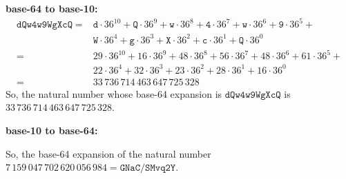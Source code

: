 \begin{mysolution}
    \textbf{base-64 to base-10:}
    \begin{align*}
        \mathtt{dQw4w9WgXcQ} =& \mathtt{d}\cdot 36^{10}+\mathtt{Q}\cdot 36^{9}+\mathtt{w}\cdot 36^{8}+\mathtt{4}\cdot 36^{7}+\mathtt{w}\cdot 36^{6}+\mathtt{9}\cdot 36^{5}+\\
        &\mathtt{W}\cdot 36^{4}+\mathtt{g}\cdot 36^{3}+\mathtt{X}\cdot 36^{2}+\mathtt{c}\cdot 36^{1}+\mathtt{Q}\cdot 36^{0}\\
        = & 29 \cdot 36^{10}+16 \cdot 36^{9}+48 \cdot 36^{8}+56 \cdot 36^{7}+48 \cdot 36^{6}+61 \cdot 36^{5}+\\
        &22 \cdot 36^{4}+32 \cdot 36^{3}+23 \cdot 36^{2}+28 \cdot 36^{1}+16 \cdot 36^{0}\\
        = & 33\,736\,714\,463\,647\,725\,328
    \end{align*}
    So, the natural number whose base-64 expansion is $\mathtt{dQw4w9WgXcQ}$ is $33\,736\,714\,463\,647\,725\,328$.
    
    \textbf{base-10 to base-64:}
    \begin{center}
    \end{center}

    So, the base-64 expansion of the natural number $7\,159\,047\,702\,620\,056\,984 = \mathtt{GNaC/SMvq2Y}$.
\end{mysolution}

